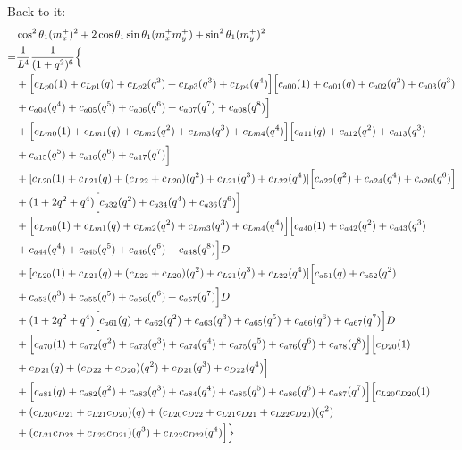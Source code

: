 \documentclass[12pt]{article}
\begin{document}
Back to it:
\begin{align}
    &\cos^2\theta_1(m_x^+)^2  + 2\cos\theta_1\sin\theta_1(m_x^+m_y^+)  +\sin^2\theta_1(m_y^+)^2 \\
    =& \frac{1}{L^4} \frac{1}{(1+q^2)^6} \Bigl\{ \nonumber\\
    &+ \Bigl[ c_{Lp0}(1) +  c_{Lp1}(q) + c_{Lp2}(q^2) + c_{Lp3}(q^3) + c_{Lp4}(q^4)  \Bigr]\Bigl[ c_{a00}(1) + c_{a01}(q) + c_{a02}(q^2) + c_{a03}(q^3) \nonumber\\
    &+ c_{a04}(q^4) + c_{a05}(q^5) + c_{a06}(q^6) + c_{a07}(q^7) +c_{a08}(q^8)  \Bigr] \nonumber\\
    &+ \Bigl[ c_{Lm0}(1) + c_{Lm1}(q)  + c_{Lm2}(q^2) + c_{Lm3}(q^3) + c_{Lm4}(q^4)  \Bigr]\Bigl[ c_{a11}(q) + c_{a12}(q^2) + c_{a13}(q^3) \nonumber\\
    &+ c_{a15}(q^5) + c_{a16}(q^6) + c_{a17}(q^7) \Bigr] \nonumber\\
    &+ [ c_{L20}(1) + c_{L21}(q)  + (c_{L22} +  c_{L20})(q^2) + c_{L21}(q^3)  + c_{L22}(q^4)]\Bigl[ c_{a22}(q^2) + c_{a24}(q^4)+ c_{a26}(q^6) \Bigr] \nonumber\\
    &+ (1+2q^2+q^4)\Bigl[ c_{a32}(q^2) + c_{a34}(q^4) +c_{a36}(q^6) \Bigr] \nonumber\\
    &+ \Bigl[ c_{Lm0}(1) + c_{Lm1}(q)  + c_{Lm2}(q^2) + c_{Lm3}(q^3) + c_{Lm4}(q^4)  \Bigr]\Bigl[ c_{a40}(1) + c_{a42}(q^2) + c_{a43}(q^3) \nonumber\\
    &+ c_{a44}(q^4) + c_{a45}(q^5) + c_{a46}(q^6) + c_{a48}(q^8)   \Bigr]D \nonumber\\
    &+ [ c_{L20}(1) + c_{L21}(q)  + (c_{L22} +  c_{L20})(q^2) + c_{L21}(q^3)  + c_{L22}(q^4)]\Bigl[ c_{a51}(q) + c_{a52}(q^2) \nonumber\\
    &+  c_{a53}(q^3) + c_{a55}(q^5) + c_{a56}(q^6)+  c_{a57}(q^7) \Bigr]D \nonumber\\
    &+ (1+2q^2+q^4)\Bigl[  c_{a61}(q)  + c_{a62}(q^2) +  c_{a63}(q^3) +c_{a65}(q^5) + c_{a66}(q^6) +c_{a67}(q^7)  \Bigr]D \nonumber\\
    &+ \Bigl[ c_{a70}(1) + c_{a72}(q^2) + c_{a73}(q^3) + c_{a74}(q^4) + c_{a75}(q^5) +  c_{a76}(q^6) + c_{a78}(q^8) \Bigr]\Bigl[ c_{D20}(1) \nonumber\\
    &+ c_{D21}(q) + (c_{D22} + c_{D20})(q^2) + c_{D21}(q^3) + c_{D22}(q^4)\Bigr] \nonumber\\
    &+ \Bigl[ c_{a81}(q) + c_{a82}(q^2) + c_{a83}(q^3) + c_{a84}(q^4) + c_{a85}(q^5) + c_{a86}(q^6) + c_{a87}(q^7) \Bigr] \Bigl[  c_{L20}c_{D20}(1) \nonumber\\
    &+ (c_{L20}c_{D21} + c_{L21}c_{D20})(q) + (c_{L20}c_{D22} + c_{L21}c_{D21} + c_{L22}c_{D20})(q^2) \nonumber\\
    &+ (c_{L21}c_{D22} + c_{L22}c_{D21})(q^3) +  c_{L22}c_{D22}(q^4) \Bigr] \Bigr\}
\end{align}
\end{document}
